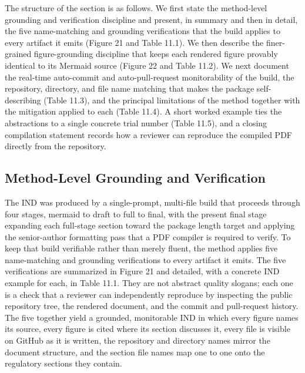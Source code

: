 The structure of the section is as follows. We first state the method-level
grounding and verification discipline and present, in summary and then in detail,
the five name-matching and grounding verifications that the build applies to every
artifact it emits (Figure 21 and Table 11.1). We then describe the finer-grained
figure-grounding discipline that keeps each rendered figure provably identical to
its Mermaid source (Figure 22 and Table 11.2). We next document the real-time
auto-commit and auto-pull-request monitorability of the build, the repository,
directory, and file name matching that makes the package self-describing (Table
11.3), and the principal limitations of the method together with the mitigation
applied to each (Table 11.4). A short worked example ties the abstractions to a
single concrete trial number (Table 11.5), and a closing compilation statement
records how a reviewer can reproduce the compiled PDF directly from the repository.

\subsection{Method-Level Grounding and Verification}

The IND was produced by a single-prompt, multi-file build that proceeds through
four stages, mermaid to draft to full to final, with the present final stage
expanding each full-stage section toward the package length target and applying the
senior-author formatting pass that a PDF compiler is required to verify. To keep
that build verifiable rather than merely fluent, the method applies five
name-matching and grounding verifications to every artifact it emits. The five
verifications are summarized in Figure 21 and detailed, with a concrete IND example
for each, in Table 11.1. They are not abstract quality slogans; each one is a check
that a reviewer can independently reproduce by inspecting the public repository
tree, the rendered document, and the commit and pull-request history. The five
together yield a grounded, monitorable IND in which every figure names its source,
every figure is cited where its section discusses it, every file is visible on
GitHub as it is written, the repository and directory names mirror the document
structure, and the section file names map one to one onto the regulatory sections
they contain.

